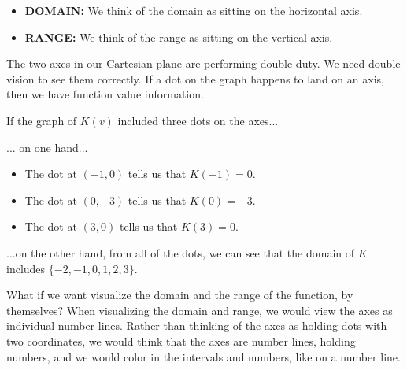\documentclass{ximera}
\begin{document}
\begin{itemize}
\item \textbf{DOMAIN:} We think of the domain as sitting on the horizontal axis.
\item \textbf{RANGE:} We think of the range as sitting on the vertical axis.
\end{itemize}


The two axes in our Cartesian plane are performing double duty.  We need double vision to see them correctly. If a dot on the graph happens to land on an axis, then we have function value information.

If the graph of $K(v)$ included three dots on the axes...

\begin{image}
\end{image}


... on one hand...
\begin{itemize}
\item The dot at $(-1,0)$ tells us that $K(-1) = 0$.
\item The dot at $(0,-3)$ tells us that $K(0) = -3$.
\item The dot at $(3,0)$ tells us that $K(3) = 0$.
\end{itemize}


...on the other hand, from all of the dots, we can see that the domain of $K$ includes $\{ -2, -1, 0, 1, 2, 3 \}$. 


What if we want visualize the domain and the range of the function, by themselves?  When visualizing the domain and range, we would view the axes as individual number lines.  Rather than thinking of the axes as holding dots with two coordinates, we would think that the axes are number lines, holding numbers, and we would color in the intervals and numbers, like on a number line.
\end{document}

